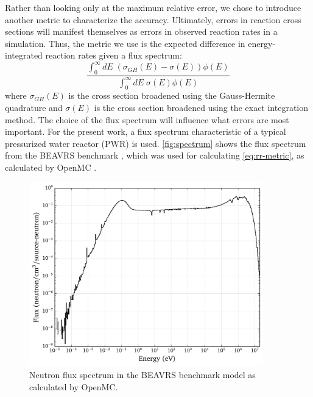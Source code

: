 \documentclass[3p,authoryear]{elsarticle}
\begin{document}
Rather than looking only at the maximum relative error, we chose to introduce
another metric to characterize the accuracy. Ultimately, errors in reaction
cross sections will manifest themselves as errors in observed reaction rates in
a simulation. Thus, the metric we use is the expected difference in
energy-integrated reaction rates given a flux spectrum:
\begin{equation}
  \label{eq:rr-metric}
  \frac{\int_0^{\infty} dE \; \left ( \sigma_{GH}(E) - \sigma(E) \right )
    \phi(E)}{\int_0^{\infty} dE \; \sigma(E) \phi(E)}
\end{equation}
where $\sigma_{GH}(E)$ is the cross section broadened using the Gauss-Hermite
quadrature and $\sigma(E)$ is the cross section broadened using the exact
integration method.  The choice of the flux spectrum will influence what errors
are most important. For the present work, a flux spectrum characteristic of a
typical pressurized water reactor (PWR) is used. \autoref{fig:spectrum} shows
the flux spectrum from the BEAVRS benchmark \citep{mc-horelik-2013}, which was
used for calculating \autoref{eq:rr-metric}, as calculated by OpenMC
\citep{ane-romano-2013}.
\begin{figure}[htbp]
  \centering
  \includegraphics[width=4in]{plots/spectrum.pdf}
  \caption{Neutron flux spectrum in the BEAVRS benchmark model as calculated by
    OpenMC.}
  \label{fig:spectrum}
\end{figure}
\end{document}
